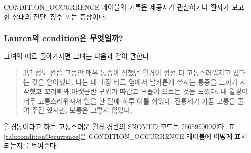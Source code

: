 \documentclass[10.5pt]{book}
\theoremstyle{definition}
\theoremstyle{definition}
\theoremstyle{definition}
\theoremstyle{remark}
\begin{document}
CONDITION\_OCCURRENCE 테이블의 기록은 제공자가 관찰하거나 환자가 보고한
상태의 진단, 징후 또는 증상이다.

\subsubsection*{Lauren의 condition은 무엇일까?}\label{lauren-condition-}

그녀의 예로 돌아가자면 그녀는 다음과 같이 말한다:

\begin{quote}
3년 정도 전쯤 그동안 매우 통증이 심했던 월경이 점점 더 고통스러워지고
있다는 것을 알아챘다. 나는 내 대장 바로 옆에서 날카롭게 쑤시는 통증을
느끼기 시작했고 꼬리뼈와 아랫골반 부위가 따갑고 부풀어 오르는 것을
느꼈다. 내 월경이 너무 고통스러워져서 일을 한 달에 하루 이틀 쉬었다.
진통제가 가끔 고통을 줄여 주긴 했지만, 보통은 그렇지 않았다.
\end{quote}

월경통이라고 하는 고통스러운 월경 경련의 SNOMED 코드는 266599000이다. 표
\ref{tab:conditionOccurrence}은 CONDITION\_OCCURRENCE 테이블에 어떻게
표시되는지를 보여준다:
\end{document}
